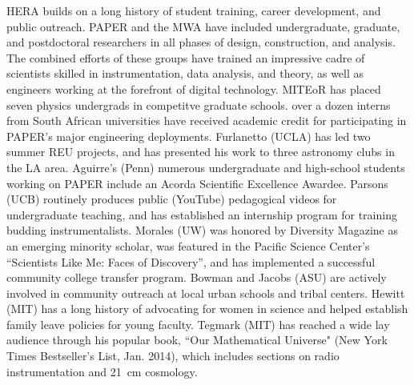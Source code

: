 \documentclass[preprint]{aastex}
\begin{document}
HERA builds on a long history of student training, career development, and public outreach.
PAPER and the MWA have
included undergraduate, graduate, and postdoctoral researchers in all
phases of design, construction, and analysis.  The combined efforts of these
groups have trained an impressive cadre of scientists skilled in
instrumentation, data analysis, and theory, as well as engineers working at the
forefront of digital technology.
MITEoR has placed seven physics undergrads 
in competitve graduate schools. over a dozen interns from South African
universities have received academic credit for participating in 
PAPER's major engineering deployments.
 Furlanetto (UCLA)
has led two summer REU projects, and has
presented his work to three astronomy clubs in the LA area. %
Aguirre's (Penn)
numerous undergraduate and high-school students working on PAPER
include an Acorda Scientific Excellence Awardee.
Parsons (UCB) routinely produces
public (YouTube) pedagogical videos for undergraduate teaching, and has established
an internship program for training budding instrumentalists.
Morales (UW) was honored by Diversity Magazine as an 
emerging minority scholar, was featured in the Pacific Science
Center’s ``Scientists Like Me: Faces of Discovery'', and has
implemented a successful community college transfer program. 
Bowman and Jacobs (ASU) are actively involved in community outreach at
local urban schools and tribal centers. Hewitt (MIT) has a long history of advocating
for women in science and helped establish
family leave policies for young faculty.
Tegmark (MIT) has reached a wide lay audience through his popular book,
``Our Mathematical Universe" (New York Times Bestseller's List, Jan. 2014),
which includes sections on radio instrumentation and 21~cm cosmology.

\end{document}
